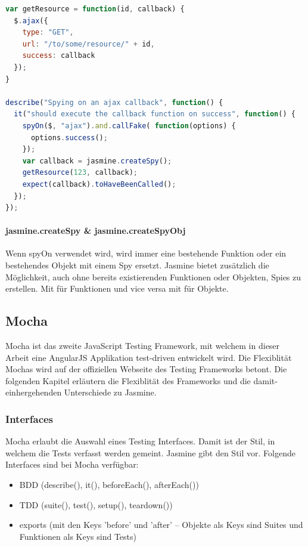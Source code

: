 \begin{lstlisting}[language=JavaScript]
var getResource = function(id, callback) {
  $.ajax({
    type: "GET",
    url: "/to/some/resource/" + id,
    success: callback
  });
}

describe("Spying on an ajax callback", function() {
  it("should execute the callback function on success", function() {
    spyOn($, "ajax").and.callFake( function(options) {
      options.success();
    });
    var callback = jasmine.createSpy();
    getResource(123, callback);
    expect(callback).toHaveBeenCalled();
  });
});
\end{lstlisting}

\paragraph{jasmine.createSpy \& jasmine.createSpyObj}
Wenn spyOn verwendet wird, wird immer eine bestehende Funktion oder ein bestehendes Objekt mit einem Spy ersetzt. Jasmine bietet zusätzlich die Möglichkeit, auch ohne bereits existierenden Funktionen oder Objekten, Spies zu erstellen. Mit  für Funktionen und vice versa mit  für Objekte.

\newpage
\subsection{Mocha}
Mocha ist das zweite JavaScript Testing Framework, mit welchem in dieser Arbeit eine AngularJS Applikation test-driven entwickelt wird. Die Flexiblität Mochas wird auf der offiziellen Webseite des Testing Frameworks  betont. Die folgenden Kapitel erläutern die Flexiblität des Frameworks und die damit-einhergehenden Unterschiede zu Jasmine.

\subsubsection{Interfaces}
Mocha erlaubt die Auswahl eines Testing Interfaces. Damit ist der Stil, in welchem die Tests verfasst werden gemeint. Jasmine gibt den Stil  vor. Folgende Interfaces sind bei Mocha verfügbar:
\begin{itemize}
  \item BDD (describe(), it(), beforeEach(), afterEach())
  \item TDD (suite(), test(), setup(), teardown())
  \item exports (mit den Keys 'before' und 'after' -- Objekte als Keys sind Suites und Funktionen als Keys sind Tests)
\end{itemize}

